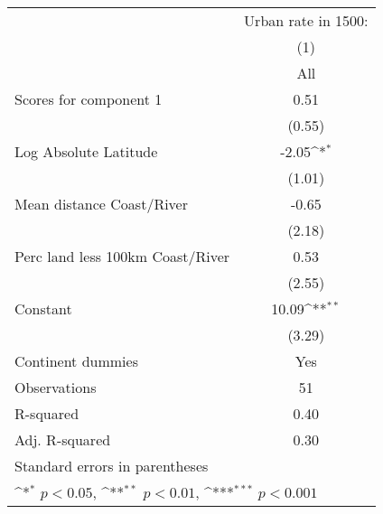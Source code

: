 {
\def\sym#1{\ifmmode^{#1}\else\(^{#1}\)\fi}
\begin{tabular}{l*{1}{c}}
\toprule
                    &\multicolumn{1}{c}{Urban rate in 1500:}\\
                    &\multicolumn{1}{c}{(1)}         \\
                    &         All         \\
\midrule
Scores for component 1&        0.51         \\
                    &      (0.55)         \\
\addlinespace
Log Absolute Latitude&       -2.05\sym{*}  \\
                    &      (1.01)         \\
\addlinespace
Mean distance Coast/River&       -0.65         \\
                    &      (2.18)         \\
\addlinespace
Perc land less 100km Coast/River&        0.53         \\
                    &      (2.55)         \\
\addlinespace
Constant            &       10.09\sym{**} \\
                    &      (3.29)         \\
\addlinespace
Continent dummies   &         Yes         \\
\midrule
Observations        &          51         \\
R-squared           &        0.40         \\
Adj. R-squared      &        0.30         \\
\bottomrule
\multicolumn{2}{l}{\footnotesize Standard errors in parentheses}\\
\multicolumn{2}{l}{\footnotesize \sym{*} \(p<0.05\), \sym{**} \(p<0.01\), \sym{***} \(p<0.001\)}\\
\end{tabular}
}
